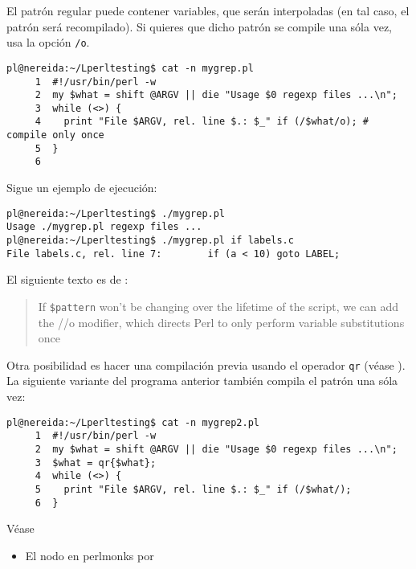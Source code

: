 
El patrón regular puede contener variables, que serán interpoladas
(en tal caso, el patrón será recompilado).
Si quieres que dicho patrón se compile una sóla vez, usa la opción
\verb|/o|.
\begin{verbatim}
pl@nereida:~/Lperltesting$ cat -n mygrep.pl
     1  #!/usr/bin/perl -w
     2  my $what = shift @ARGV || die "Usage $0 regexp files ...\n";
     3  while (<>) {
     4    print "File $ARGV, rel. line $.: $_" if (/$what/o); # compile only once
     5  }
     6
\end{verbatim}
Sigue un ejemplo de ejecución:
\begin{verbatim}
pl@nereida:~/Lperltesting$ ./mygrep.pl
Usage ./mygrep.pl regexp files ...
pl@nereida:~/Lperltesting$ ./mygrep.pl if labels.c
File labels.c, rel. line 7:        if (a < 10) goto LABEL;
\end{verbatim}

El siguiente texto es de :

\begin{it}
\begin{quotation}
If \verb|$pattern|  won't be changing over the lifetime of the script,
we can add the //o modifier, which directs Perl to only perform variable
substitutions once
\end{quotation}
\end{it}

Otra posibilidad es hacer una compilación previa usando el operador 
\verb|qr| (véase ).
La siguiente variante del programa anterior también compila el patrón
una sóla vez:
\begin{verbatim}
pl@nereida:~/Lperltesting$ cat -n mygrep2.pl
     1  #!/usr/bin/perl -w
     2  my $what = shift @ARGV || die "Usage $0 regexp files ...\n";
     3  $what = qr{$what};
     4  while (<>) {
     5    print "File $ARGV, rel. line $.: $_" if (/$what/);
     6  }
\end{verbatim}

Véase 
\begin{itemize}
\item El nodo en perlmonks  por 
\end{itemize}
  


